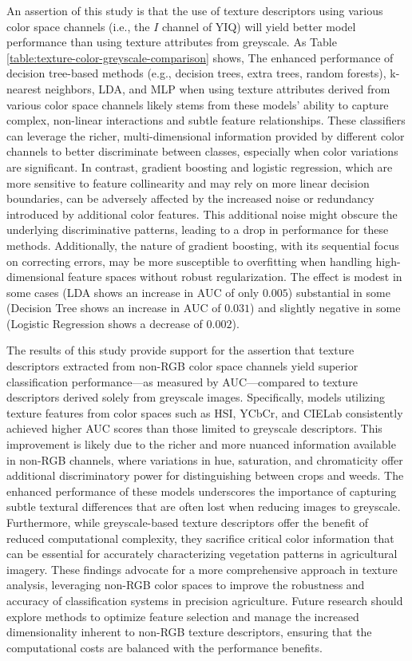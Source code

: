 \documentclass[letterpaper]{report}
\begin{document}
An assertion of this study is that the use of texture descriptors using various color space channels (i.e., the $I$ channel of YIQ) will yield better model performance than using texture attributes from greyscale.  As Table \ref{table:texture-color-greyscale-comparison} shows, The enhanced performance of decision tree-based methods (e.g., decision trees, extra trees, random forests), k-nearest neighbors, LDA, and MLP when using texture attributes derived from various color space channels likely stems from these models’ ability to capture complex, non-linear interactions and subtle feature relationships. These classifiers can leverage the richer, multi-dimensional information provided by different color channels to better discriminate between classes, especially when color variations are significant. In contrast, gradient boosting and logistic regression, which are more sensitive to feature collinearity and may rely on more linear decision boundaries, can be adversely affected by the increased noise or redundancy introduced by additional color features. This additional noise might obscure the underlying discriminative patterns, leading to a drop in performance for these methods. Additionally, the nature of gradient boosting, with its sequential focus on correcting errors, may be more susceptible to overfitting when handling high-dimensional feature spaces without robust regularization. The effect is modest in some cases (LDA shows an increase in AUC of only $0.005$) substantial in some (Decision Tree shows an increase in AUC of $0.031$) and slightly negative in some (Logistic Regression shows a decrease of $0.002$).

The results of this study provide support for the assertion that texture descriptors extracted from non-RGB color space channels yield superior classification performance—as measured by AUC—compared to texture descriptors derived solely from greyscale images. Specifically, models utilizing texture features from color spaces such as HSI, YCbCr, and CIELab consistently achieved higher AUC scores than those limited to greyscale descriptors. This improvement is likely due to the richer and more nuanced information available in non-RGB channels, where variations in hue, saturation, and chromaticity offer additional discriminatory power for distinguishing between crops and weeds. The enhanced performance of these models underscores the importance of capturing subtle textural differences that are often lost when reducing images to greyscale. Furthermore, while greyscale-based texture descriptors offer the benefit of reduced computational complexity, they sacrifice critical color information that can be essential for accurately characterizing vegetation patterns in agricultural imagery. These findings advocate for a more comprehensive approach in texture analysis, leveraging non-RGB color spaces to improve the robustness and accuracy of classification systems in precision agriculture. Future research should explore methods to optimize feature selection and manage the increased dimensionality inherent to non-RGB texture descriptors, ensuring that the computational costs are balanced with the performance benefits.
\end{document}
